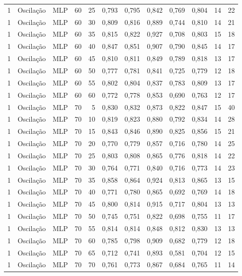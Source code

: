 \begin{longtable}{ccclrrrrrrrr}
1 & Oscilação & MLP & 60 & 25 & 0,793 & 0,795 & 0,842 & 0,769 & 0,804 & 14 & 22 \\
1 & Oscilação & MLP & 60 & 30 & 0,809 & 0,816 & 0,889 & 0,744 & 0,810 & 14 & 21 \\
1 & Oscilação & MLP & 60 & 35 & 0,815 & 0,822 & 0,927 & 0,708 & 0,803 & 15 & 18 \\
1 & Oscilação & MLP & 60 & 40 & 0,847 & 0,851 & 0,907 & 0,790 & 0,845 & 14 & 17 \\
1 & Oscilação & MLP & 60 & 45 & 0,810 & 0,811 & 0,849 & 0,789 & 0,818 & 13 & 17 \\
1 & Oscilação & MLP & 60 & 50 & 0,777 & 0,781 & 0,841 & 0,725 & 0,779 & 12 & 18 \\
1 & Oscilação & MLP & 60 & 55 & 0,802 & 0,804 & 0,837 & 0,783 & 0,809 & 13 & 17 \\
1 & Oscilação & MLP & 60 & 60 & 0,772 & 0,778 & 0,853 & 0,690 & 0,763 & 12 & 17 \\
1 & Oscilação & MLP & 70 & 5 & 0,830 & 0,832 & 0,873 & 0,822 & 0,847 & 15 & 40 \\
1 & Oscilação & MLP & 70 & 10 & 0,819 & 0,823 & 0,880 & 0,792 & 0,834 & 14 & 28 \\
1 & Oscilação & MLP & 70 & 15 & 0,843 & 0,846 & 0,890 & 0,825 & 0,856 & 15 & 21 \\
1 & Oscilação & MLP & 70 & 20 & 0,770 & 0,779 & 0,857 & 0,716 & 0,780 & 14 & 25 \\
1 & Oscilação & MLP & 70 & 25 & 0,803 & 0,808 & 0,865 & 0,776 & 0,818 & 14 & 22 \\
1 & Oscilação & MLP & 70 & 30 & 0,764 & 0,771 & 0,840 & 0,716 & 0,773 & 14 & 23 \\
1 & Oscilação & MLP & 70 & 35 & 0,858 & 0,864 & 0,924 & 0,813 & 0,865 & 13 & 15 \\
1 & Oscilação & MLP & 70 & 40 & 0,771 & 0,780 & 0,865 & 0,692 & 0,769 & 14 & 18 \\
1 & Oscilação & MLP & 70 & 45 & 0,800 & 0,814 & 0,915 & 0,717 & 0,804 & 13 & 13 \\
1 & Oscilação & MLP & 70 & 50 & 0,745 & 0,751 & 0,822 & 0,698 & 0,755 & 11 & 17 \\
1 & Oscilação & MLP & 70 & 55 & 0,814 & 0,814 & 0,848 & 0,812 & 0,830 & 13 & 13 \\
1 & Oscilação & MLP & 70 & 60 & 0,785 & 0,798 & 0,909 & 0,682 & 0,779 & 12 & 18 \\
1 & Oscilação & MLP & 70 & 65 & 0,712 & 0,741 & 0,893 & 0,581 & 0,704 & 12 & 15 \\
1 & Oscilação & MLP & 70 & 70 & 0,761 & 0,773 & 0,867 & 0,684 & 0,765 & 11 & 14 \\

\end{longtable}

